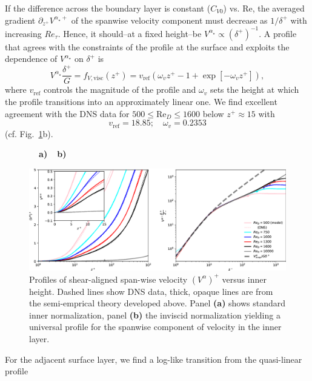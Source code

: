 \documentclass[smallcondensed,final]{svjour3}
\newcommand{\RE}{\mathrm{Re}}
\begin{document}
If the difference across the boundary layer is constant ($C_{V0}$) vs. $\RE$,
the averaged gradient $\partial_{z^+} V^{\alpha_\star+}$ of the spanwise velocity component
must decrease as $1/\delta^+$ with increasing $Re_\tau$. 
%
Hence, it should--at a fixed height--be $V^{\alpha_\star} \propto \left(\delta^{+}\right)^{-1}$.
%
A profile that agrees with the constraints of the profile at the surface
and exploits the dependence of $V^{\alpha_\star}$ on $\delta^+$ is 
\begin{equation}
  V^{\alpha_\star}\frac{\delta^+}{G} = f_{V,\mathrm{visc}}(z^+) = v_\mathrm{ref} \left( \omega_v z^+ -1 + \exp[-\omega_v z^+]\right),
  \label{eqn:scaling_spanwise} 
\end{equation}
where $v_\mathrm{ref}$ controls the magnitude of the profile and $\omega_v$ sets the height at which the profile
transitions into an approximately linear one.
%
We find excellent agreement with the DNS data for $500\le\RE_D\le1600$ below $z^+\approx 15$ with
\[v_\mathrm{ref} = 18.85;  \quad \omega_v=0.2353\]
(cf. Fig.~\ref{fig:inner_w}b). 
%
\begin{figure}
  \begin{flushleft}
    \textbf{\ \ a)}\hspace{0.45\textwidth}\textbf{\ \ b)}\\
  \end{flushleft} 
  \includegraphics[width=1.0\textwidth]{Fig8.eps} %
  \caption{Profiles of shear-aligned span-wise velocity $(V^\alpha)^+$ versus inner height. 
    Dashed lines show DNS data, thick, opaque lines are from the semi-emprical theory developed above.
    Panel \textbf{(a)} shows standard inner normalization, panel \textbf{(b)} the inviscid normalization yielding
    a universal profile for the spanwise component of velocity in the inner layer. }
  \label{fig:inner_w}
\end{figure}
\par
%
For the adjacent surface layer, we find a log-like transition from the quasi-linear profile
\end{document}
